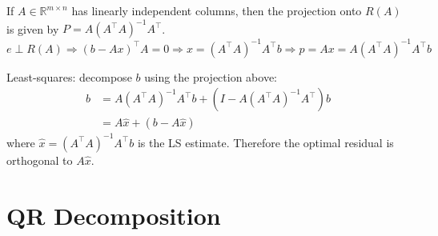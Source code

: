 \documentclass[13pt]{article}
\theoremstyle{definition}
\theoremstyle{remark}
\begin{document}
\begin{multicols}{2}
If $A \in \mathbb{R}^{m \times n}$ has linearly independent columns, then the projection onto $R(A)$ is given by $P=A\left(A^{\top} A\right)^{-1} A^{\top}$.
\[e\perp R(A) \Longrightarrow (b-Ax)^\top A = 0 \Longrightarrow x = \left(A^{\top} A\right)^{-1} A^{\top} b \Longrightarrow p = Ax = A\left(A^{\top} A\right)^{-1} A^{\top}b\]

Least-squares: decompose $b$ using the projection above:
$$
\begin{aligned}
b & =A\left(A^{\top} A\right)^{-1} A^{\top} b+\left(I-A\left(A^{\top} A\right)^{-1} A^{\top}\right) b \\
& =A \hat{x}+(b-A \hat{x})
\end{aligned}
$$
where $\hat{x}=\left(A^{\top} A\right)^{-1} A^{\top} b$ is the LS estimate. Therefore the optimal residual is orthogonal to $A \hat{x}$.

    
\end{multicols}

\headrule

\section{QR Decomposition}



\headrule
\end{document}
